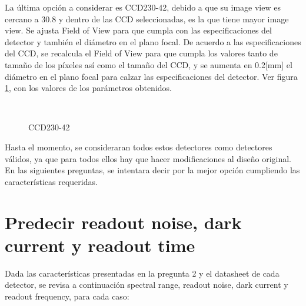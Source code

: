 \documentclass[a4paper,10pt]{article}
\begin{document}
La última opción a considerar es CCD230-42, debido a que su image view es
cercano a 30.8 y dentro de las CCD seleccionadas, es la que tiene mayor image
view. Se ajusta Field of View para que cumpla con las especificaciones del
detector  y también el diámetro en el plano focal. De acuerdo a las
especificaciones del CCD, se recalcula el Field of View para que cumpla los
valores tanto de tamaño de los píxeles así como el tamaño del CCD, y se aumenta
en 0.2[mm] el diámetro en el plano focal para calzar las especificaciones del
detector.  Ver figura \ref{fig:ccd230p2}, con los valores de los parámetros
obtenidos.
\begin{figure}[ht!]
  \centering
  ~ 
  ~ 
  \caption{CCD230-42}
  \label{fig:ccd230p2}
\end{figure}

Hasta el momento, se consideraran todos estos detectores como detectores
válidos, ya que para todos ellos hay que hacer modificaciones al diseño
original. En las siguientes preguntas, se intentara decir por la mejor opción
cumpliendo las características requeridas.
\section{Predecir readout noise, dark current y readout time}
Dada las características presentadas en la pregunta 2 y el datasheet de cada
detector, se revisa a continuación spectral range, readout noise, dark current y readout
frequency, para cada caso:
\end{document}
